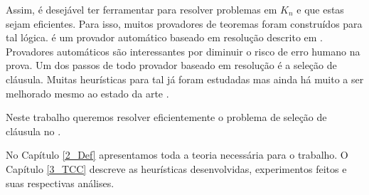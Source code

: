 Assim, é desejável ter ferramentar para resolver problemas em $K_n$ e que estas sejam eficientes. Para isso, muitos provadores de teoremas foram construídos para tal lógica. %
\ksp é um provador automático baseado em resolução descrito em \cite{Nalon2020}. Provadores automáticos são interessantes por diminuir o risco de erro humano na prova. Um dos passos de todo provador baseado em resolução é a seleção de cláusula. Muitas heurísticas para tal já foram estudadas mas ainda há muito a ser melhorado mesmo ao estado da arte \cite{stephan}. %


Neste trabalho queremos resolver eficientemente o problema de seleção de cláusula no \ksp.


No Capítulo \ref{2_Def} apresentamos toda a teoria necessária para o trabalho. O Capítulo \ref{3_TCC} descreve as heurísticas desenvolvidas, experimentos feitos e suas respectivas análises.


